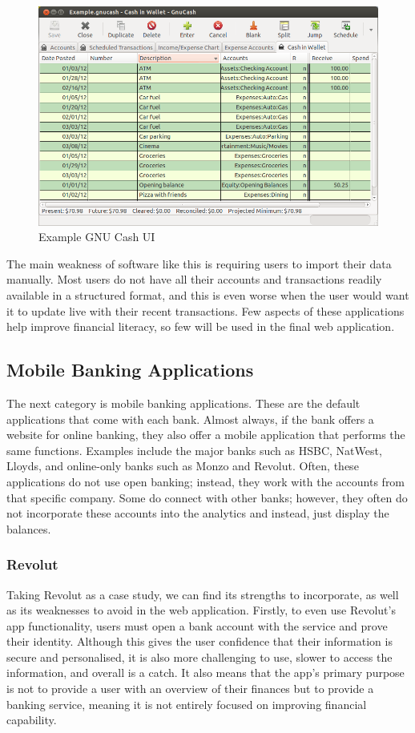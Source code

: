 \begin{figure}[H]
	\centering
    \includegraphics[width=\textwidth]{images/gnucash.png}
    \caption{Example GNU Cash UI \cite{GNUCashUI}}
    \label{fig:gnucash_ui}
\end{figure}

The main weakness of software like this is requiring users to import their data manually. Most users do not have all their accounts and transactions readily available in a structured format, and this is even worse when the user would want it to update live with their recent transactions. Few aspects of these applications help improve financial literacy, so few will be used in the final web application.


\subsection{Mobile Banking Applications}
\label{sec:mobile-banking-applications}
The next category is mobile banking applications. These are the default applications that come with each bank. Almost always, if the bank offers a website for online banking, they also offer a mobile application that performs the same functions. Examples include the major banks such as HSBC, NatWest, Lloyds, and online-only banks such as Monzo and Revolut. Often, these applications do not use open banking; instead, they work with the accounts from that specific company. Some do connect with other banks; however, they often do not incorporate these accounts into the analytics and instead, just display the balances.

\subsubsection{Revolut}
Taking Revolut \cite{RevolutWebsite} as a case study, we can find its strengths to incorporate, as well as its weaknesses to avoid in the web application. Firstly, to even use Revolut's app functionality, users must open a bank account with the service and prove their identity. Although this gives the user confidence that their information is secure and personalised, it is also more challenging to use, slower to access the information, and overall is a catch. It also means that the app's primary purpose is not to provide a user with an overview of their finances but to provide a banking service, meaning it is not entirely focused on improving financial capability.

